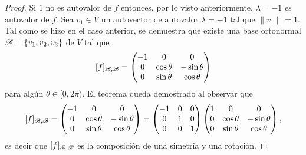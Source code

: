 \begin{prop}
\begin{proof}
        Si $1$ no es autovalor de $f$ entonces, por lo visto anteriormente,
        $\lambda=-1$ es autovalor de $f$. Sea $v_1\in V$ un autovector de
        autovalor $\lambda=-1$ tal que $\|v_1\|=1$. Tal como se hizo en el caso
        anterior, se demuestra que existe una base ortonormal
        $\mathscr{B}=\{v_1,v_2,v_3\}$ de $V$ tal que 
        \[
         [f]_{\mathscr{B},\mathscr{B}}=
        \begin{pmatrix}
            -1 & 0 & 0\\
            0 & \cos\theta & -\sin\theta\\
            0 & \sin\theta & \cos\theta
        \end{pmatrix}
        \]
        para algún $\theta\in[0,2\pi)$. El teorema queda demostrado al observar que
        \[
        [f]_{\mathscr{B},\mathscr{B}}=
        \begin{pmatrix}
            -1 & 0 & 0\\
            0 & \cos\theta & -\sin\theta\\
            0 & \sin\theta & \cos\theta
        \end{pmatrix}
        =
        \begin{pmatrix}
            -1 & 0 & 0\\
            0 & 1 & 0\\
            0 & 0 & 1
        \end{pmatrix}
        \begin{pmatrix}
            1 & 0 & 0\\
            0 & \cos\theta & -\sin\theta\\
            0 & \sin\theta & \cos\theta
        \end{pmatrix},
        \]
        es decir que $[f]_{\mathscr{B},\mathscr{B}}$ es la composición de una simetría y una
        rotación. 
    \end{proof}
\end{prop}

